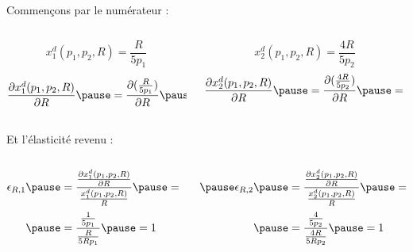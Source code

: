 \documentclass[9pt,handout,professionalfonts,hyperref]{beamer}
\begin{document}
\begin{frame}
	Commençons par le numérateur :

	\begin{columns}
		\begin{column}{0.5\textwidth}
			$$x_1^d(p_1,p_2,R) = \frac{R}{5p_1}$$

			\[\begin{aligned}
			\frac{\partial x_1^d(p_1,p_2,R) }{\partial R} \pause= \frac{\partial (\frac{R}{5p_1}) }{\partial R} \pause= \frac{1}{5p_1}\frac{\partial R}{\partial R} = \frac{1}{5p_1}\\
			\end{aligned}\]
		\end{column}
		\begin{column}{0.5\textwidth}
			\pause	$$x_2^d(p_1,p_2,R) = \frac{4R}{5p_2}$$
			\[\begin{aligned}
			\frac{\partial x_2^d(p_1,p_2,R) }{\partial R} \pause= \frac{\partial (\frac{4R}{5p_2}) }{\partial R} \pause= \frac{4}{5p_2}\frac{\partial R}{\partial R}\pause =\frac{4}{5p_2}\\
			\end{aligned}\]
		\end{column}
	\end{columns}

	\bigskip

	Et l'élasticité revenu :\newline

	\begin{columns}
		\begin{column}{0.5\textwidth}
			\Large
			\[\begin{aligned}
			\epsilon_{R,1}
			\pause&= \frac{\frac{\partial x_1^d(p_1,p_2,R)}{\partial R}}{\frac{x_1^d(p_1,p_2,R) }{R}} \pause= \frac{\frac{1}{5p_1}}{\frac{\frac{R}{5p_1}}{R}} \\
			\pause&= \frac{\frac{1}{5p_1}}{\frac{R}{5Rp_1}} \pause=1
			\end{aligned}\]
		\end{column}
		\begin{column}{0.5\textwidth}
			\Large
			\[\begin{aligned}
			\pause\epsilon_{R,2}
			\pause &= \frac{\frac{\partial x_2^d(p_1,p_2,R)}{\partial R}}{\frac{x_2^d(p_1,p_2,R) }{R}} \pause = \frac{\frac{4}{5p_2}}{\frac{\frac{4R}{5p_2}}{R}} \\
			\pause&= \frac{\frac{4}{5p_2}}{\frac{4R}{5Rp_2}} \pause=1
			\end{aligned}\]
		\end{column}
	\end{columns}

\end{frame}
\end{document}
